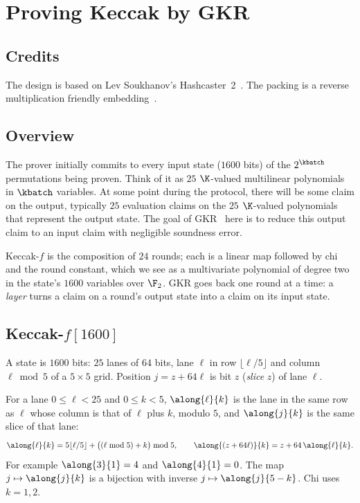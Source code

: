 \section{Proving Keccak by GKR}\label{annex:keccak}

\subsection{Credits}\label{keccak:credits}

The design is based on Lev Soukhanov's Hashcaster~2~\cite{Hashcaster2}. The packing is a reverse multiplication friendly embedding~\cite{CCXY18}.

\subsection{Overview}\label{keccak:overview}

The prover initially commits to every input state ($1600$ bits) of the $2^{\kbatch}$ permutations being proven. Think of it as $25$ $\K$-valued multilinear polynomials in $\kbatch$ variables. At some point during the protocol, there will be some claim on the output, typically $25$ evaluation claims on the $25$ $\K$-valued polynomials that represent the output state. The goal of GKR~\cite{GKR08} here is to reduce this output claim to an input claim with negligible soundness error.

Keccak-$f$ is the composition of $24$ rounds; each is a linear map followed by chi and the round constant, which we see as a multivariate polynomial of degree two in the state's $1600$ variables over $\F_2$. GKR goes back one round at a time: a \emph{layer} turns a claim on a round's output state into a claim on its input state.

\subsection{Keccak-\texorpdfstring{$f[1600]$}{f[1600]}}\label{keccak:perm}

A state is $1600$ bits: $25$ lanes of $64$ bits, lane $\ell$ in row $\lfloor\ell/5\rfloor$ and column $\ell\bmod5$ of a $5\times5$ grid. Position $j=z+64\ell$ is bit $z$ (\emph{slice} $z$) of lane $\ell$.

For a lane $0\le\ell<25$ and $0\le k<5$, $\along{\ell}{k}$ is the lane in the same row as $\ell$ whose column is that of $\ell$ plus $k$, modulo $5$, and $\along{j}{k}$ is the same slice of that lane:
\[
\along{\ell}{k}=5\lfloor\ell/5\rfloor+\bigl((\ell\bmod5)+k\bigr)\bmod5,\qquad \along{(z+64\ell)}{k}=z+64\,\along{\ell}{k}.
\]
For example $\along{3}{1}=4$ and $\along{4}{1}=0$. The map $j\mapsto\along{j}{k}$ is a bijection with inverse $j\mapsto\along{j}{5-k}$. Chi uses $k=1,2$.

